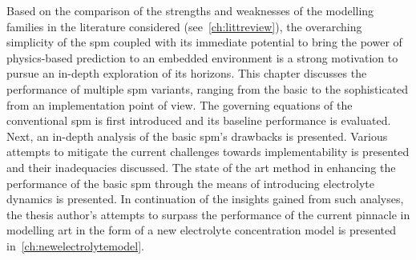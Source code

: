 




Based  on the  comparison  of  the strengths  and  weaknesses  of the  modelling
families   in   the   literature  considered   (see~\cref{ch:littreview}),   the
overarching simplicity of the \gls{spm}  coupled with its immediate potential to
bring the  power of  physics-based prediction  to an  embedded environment  is a
strong  motivation to  pursue  an  in-depth exploration  of  its horizons.  This
chapter discusses the  performance of multiple \gls{spm}  variants, ranging from
the  basic to  the  sophisticated  from an  implementation  point  of view.  The
governing  equations  of the  conventional  \gls{spm}  is first  introduced  and
its  baseline  performance is  evaluated.  Next,  an  in-depth analysis  of  the
basic  \gls{spm}'s drawbacks  is  presented. Various  attempts  to mitigate  the
current challenges towards implementability  is presented and their inadequacies
discussed. The state of the art method in enhancing the performance of the basic
\gls{spm} through the means of introducing electrolyte dynamics is presented. In
continuation  of the  insights gained  from such  analyses, the  thesis author's
attempts  to  surpass the  performance  of  the  current pinnacle  in  modelling
art  in  the  form  of  a  new  electrolyte  concentration  model  is  presented
in~\cref{ch:newelectrolytemodel}.










